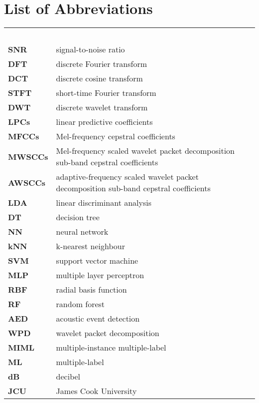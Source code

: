 

\chapter*{List of Abbreviations}


\renewcommand{\arraystretch}{1.4} 
\begin{longtable}{llr}
\multicolumn{3}{l}{\textbf{}\hspace{0.4\textwidth}~~}\\
\textbf{SNR}   &     signal-to-noise ratio\\
\textbf{DFT}   &                    discrete Fourier transform \\
\textbf{DCT}    &                    discrete cosine transform \\
\textbf{STFT} & short-time Fourier transform \\
\textbf{DWT}   & discrete wavelet transform \\
\textbf{LPCs}	 &                   linear predictive coefficients \\
\textbf{MFCCs} &	       Mel-frequency cepstral coefficients \\
\textbf{MWSCCs} & Mel-frequency scaled wavelet packet decomposition sub-band cepstral coefficients \\
\textbf{AWSCCs} & adaptive-frequency scaled wavelet packet decomposition sub-band cepstral coefficients \\
\textbf{LDA}      &                  linear discriminant analysis \\
\textbf{DT}     &                  decision tree                       \\
\textbf{NN}     &    neural network  \\
\textbf{kNN}	  &                  k-nearest neighbour \\
\textbf{SVM}	     &               support vector machine \\
\textbf{MLP}    &                   multiple layer perceptron \\
\textbf{RBF}    &                   radial basis function \\
\textbf{RF}     &                      random forest \\
\textbf{AED}	   &                 acoustic event detection \\
\textbf{WPD}     &                 wavelet packet decomposition \\
\textbf{MIML}   &                 multiple-instance multiple-label  \\ 
\textbf{ML}    &                      multiple-label \\
\textbf{dB}    &                      decibel \\
\textbf{JCU} & James Cook University \\
\end{longtable}

